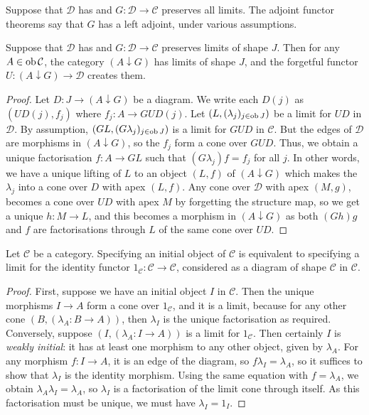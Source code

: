 Suppose that \( \mathcal D \) has and \( G : \mathcal D \to \mathcal C \) preserves all limits.
The adjoint functor theorems say that \( G \) has a left adjoint, under various assumptions.
\begin{lemma}
    Suppose that \( \mathcal D \) has and \( G : \mathcal D \to \mathcal C \) preserves limits of shape \( J \).
    Then for any \( A \in \operatorname{ob} \mathcal C \), the category \( (A \downarrow G) \) has limits of shape \( J \), and the forgetful functor \( U : (A \downarrow G) \to \mathcal D \) creates them.
\end{lemma}
\begin{proof}
    Let \( D : J \to (A \downarrow G) \) be a diagram.
    We write each \( D(j) \) as \( (UD(j), f_j) \) where \( f_j : A \to GUD(j) \).
    Let \( (L, (\lambda_j)_{j \in \operatorname{ob} J}) \) be a limit for \( UD \) in \( \mathcal D \).
    By assumption, \( (GL, (G\lambda_j)_{j \in \operatorname{ob} J}) \) is a limit for \( GUD \) in \( \mathcal C \).
    But the edges of \( \mathcal D \) are morphisms in \( (A \downarrow G) \), so the \( f_j \) form a cone over \( GUD \).
    Thus, we obtain a unique factorisation \( f : A \to GL \) such that \( (G\lambda_j) f = f_j \) for all \( j \).
    In other words, we have a unique lifting of \( L \) to an object \( (L, f) \) of \( (A \downarrow G) \) which makes the \( \lambda_j \) into a cone over \( D \) with apex \( (L, f) \).
    Any cone over \( \mathcal D \) with apex \( (M, g) \), becomes a cone over \( UD \) with apex \( M \) by forgetting the structure map, so we get a unique \( h : M \to L \), and this becomes a morphism in \( (A \downarrow G) \) as both \( (Gh)g \) and \( f \) are factorisations through \( L \) of the same cone over \( UD \).
\end{proof}
\begin{lemma}
    Let \( \mathcal C \) be a category.
    Specifying an initial object of \( \mathcal C \) is equivalent to specifying a limit for the identity functor \( 1_{\mathcal C} : \mathcal C \to \mathcal C \), considered as a diagram of shape \( \mathcal C \) in \( \mathcal C \).
\end{lemma}
\begin{proof}
    First, suppose we have an initial object \( I \) in \( \mathcal C \).
    Then the unique morphisms \( I \to A \) form a cone over \( 1_{\mathcal C} \), and it is a limit, because for any other cone \( (B, (\lambda_A : B \to A)) \), then \( \lambda_I \) is the unique factorisation as required.
    Conversely, suppose \( (I, (\lambda_A : I \to A)) \) is a limit for \( 1_{\mathcal C} \).
    Then certainly \( I \) is \emph{weakly initial}: it has at least one morphism to any other object, given by \( \lambda_A \).
    For any morphism \( f : I \to A \), it is an edge of the diagram, so \( f \lambda_I = \lambda_A \), so it suffices to show that \( \lambda_I \) is the identity morphism.
    Using the same equation with \( f = \lambda_A \), we obtain \( \lambda_A \lambda_I = \lambda_A \), so \( \lambda_I \) is a factorisation of the limit cone through itself.
    As this factorisation must be unique, we must have \( \lambda_I = 1_I \).
\end{proof}
